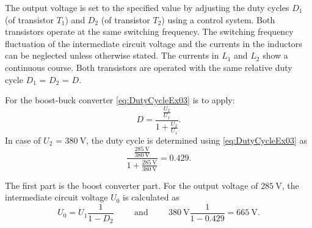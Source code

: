 The output voltage is set to the specified value by adjusting the duty cycles $D_\mathrm{1}$ (of transistor $T_\mathrm{1}$) 
and $D_\mathrm{2}$ (of transistor $T_\mathrm{2}$) using a control system. Both transistors operate at the same switching frequency. 
The switching frequency fluctuation of the intermediate circuit voltage and the currents in the inductors can be neglected unless otherwise stated. 
The currents in $L_\mathrm{1}$ and $L_\mathrm{2}$ show a continuous course. Both transistors are operated with the 
same relative duty cycle $D_\mathrm{1}$ = $D_\mathrm{2}$ = $D$.


\begin{solutionblock}
    For the boost-buck converter \eqref{eq:DutyCycleEx03} is to apply:
    \begin{equation}
        D = \frac{\frac{U_\mathrm{2}}{U_\mathrm{1}}} {1+{\frac{U_\mathrm{2}}{U_\mathrm{1}}}}.
        \label{eq:DutyCycleEx03}
    \end{equation}
    In case of $U_\mathrm{2}$ = $\SI{380}{\volt}$, the duty cycle is determined using \eqref{eq:DutyCycleEx03} as
    \begin{equation}
       \frac{\frac{\SI{285}{\volt}}{\SI{380}{\volt}}} {1+{\frac{\SI{285}{\volt}}{\SI{380}{\volt}}}} = 0.429.
    \end{equation}
\end{solutionblock}



\begin{solutionblock}
    The first part is the boost converter part. For the output voltage 
    of $\SI{285}{\volt}$, the intermediate circuit voltage $U_\mathrm{0}$ is calculated as
    \begin{equation}
        U_\mathrm{0}=U_\mathrm{1} \frac{1}{1-D_\mathrm{2}} 
        \hspace{1cm} \mathrm{and} \hspace{1cm}  
        \SI{380}{\volt} \frac{1}{1-0.429} = \SI{665}{\volt}.
        \label{eq:DCLinkEx03}        
    \end{equation}
\end{solutionblock}



